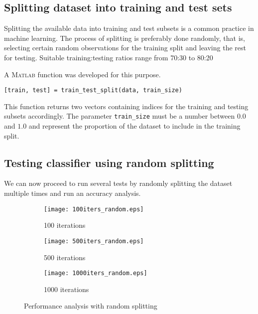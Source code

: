 \subsection{Splitting dataset into training and test sets}

Splitting the available data into training and test subsets is a common practice in machine learning. The process of splitting is preferably done randomly, that is, selecting certain random observations for the training split and leaving the rest for testing. Suitable training:testing ratios range from 70:30 to 80:20

A \textsc{Matlab} function was developed for this purpose.
\begin{lstlisting}
[train, test] = train_test_split(data, train_size)
\end{lstlisting}

This function returns two vectors containing indices for the training and testing subsets accordingly. The parameter \texttt{train\_size}  must be a number between $0.0$ and $1.0$ and represent the proportion of the dataset to include in the training split.

\subsection{Testing classifier using random splitting}

We can now proceed to run several tests by randomly splitting the dataset multiple times and run an accuracy analysis. 
\begin{figure}[h]
	\centering
	\begin{subfigure}{.45\textwidth}
		\centering
		\texttt{[image: 100iters\_random.eps]}
		\caption{100 iterations}
		\label{fig:100iters_random}
	\end{subfigure}
	\begin{subfigure}{.45\textwidth}
		\centering
		\texttt{[image: 500iters\_random.eps]}
		\caption{500 iterations}
		\label{fig:500iters_random}
	\end{subfigure}
	\begin{subfigure}{.45\textwidth}
		\centering
		\texttt{[image: 1000iters\_random.eps]}
		\caption{1000 iterations}
		\label{fig:1000iters_random}
	\end{subfigure}
	\caption{Performance analysis with random splitting}
	\label{fig:random_splitting}
\end{figure}

